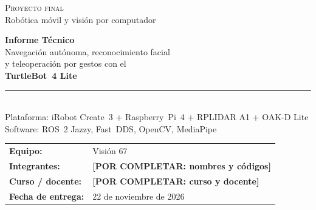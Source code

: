 \documentclass[11pt,a4paper]{article}
\newcommand{\pend}[1]{\textcolor{rojo}{\textbf{[POR COMPLETAR: #1]}}}
\begin{document}
\begin{titlepage}
\thispagestyle{empty}
\vspace*{0.4cm}
{\color{white}\Large\textsc{Proyecto final}\\[1mm]\large Rob\'otica m\'ovil y visi\'on por computador}\\[2.2cm]
\begin{flushleft}
{\Huge\bfseries\color{azul} Informe T\'ecnico}\\[5mm]
{\Large Navegaci\'on aut\'onoma, reconocimiento facial\\ y teleoperaci\'on por gestos con el\\ \textbf{TurtleBot~4 Lite}}\\[1.2cm]
\rule{0.35\textwidth}{1.2pt}\\[6mm]
{\large Plataforma: iRobot Create~3 + Raspberry~Pi~4 + RPLIDAR A1 + OAK-D Lite\\
Software: ROS~2 Jazzy, Fast~DDS, OpenCV, MediaPipe}
\end{flushleft}
\vfill
\noindent\begin{tabular}{@{}ll@{}}
\textbf{Equipo:} & Visi\'on 67 \\
\textbf{Integrantes:} & \pend{nombres y c\'odigos} \\
\textbf{Curso / docente:} & \pend{curso y docente} \\
\textbf{Fecha de entrega:} & 22 de noviembre de 2026 \\
\end{tabular}
\end{titlepage}
\end{document}
